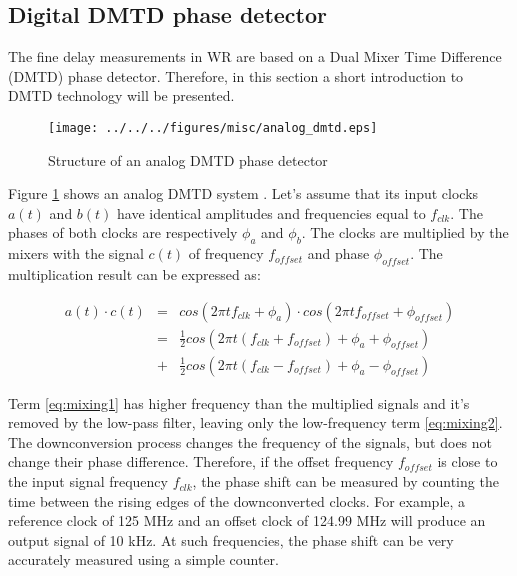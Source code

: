 \subsection{Digital DMTD phase detector}
\label{s:dmtd}
The fine delay measurements in WR are based on a Dual Mixer Time Difference
(DMTD) phase detector. Therefore, in this section a short introduction to
DMTD technology will be presented.
\begin{figure}[ht!]
  \centering
  \texttt{[image: ../../../figures/misc/analog\_dmtd.eps]}
  \caption{Structure of an analog DMTD phase detector}
  \label{fig:analog_dmtd}
\end{figure}
Figure \ref{fig:analog_dmtd} shows an analog DMTD system \cite{allan90}. Let's
assume that its input clocks $a(t)$ and $b(t)$ have identical amplitudes and
frequencies equal to $f_{clk}$. The phases of both clocks are respectively
$\phi_{a}$ and $\phi_{b}$. The clocks are multiplied by the mixers with
the signal $c(t)$ of frequency $f_{offset}$ and phase $\phi_{offset}$. The
multiplication result can be expressed as:

\begin{eqnarray}
    a(t) \cdot c(t) & = & cos(2\pi t f_{clk} + \phi_{a}) \cdot cos (2\pi t
    f_{offset} + \phi_{offset}) \nonumber \\
\label{eq:mixing1}& = & \frac{1}{2} cos(2\pi t (f_{clk} + f_{offset}) +
\phi_a + \phi_{offset}) \\
\label{eq:mixing2}& + & \frac{1}{2} cos (2 \pi t (f_{clk} - f_{offset}) +
\phi_a - \phi_{offset})
\end{eqnarray}

Term \ref{eq:mixing1} has higher frequency than the multiplied signals and
it's removed by the low-pass filter, leaving only the low-frequency term
\ref{eq:mixing2}. The downconversion process changes the frequency of the
signals, but does not change their phase difference. Therefore, if the offset
frequency $f_{offset}$ is close to the input signal frequency $f_{clk}$,
the phase shift can be measured by counting the time between the rising
edges of the downconverted clocks. For example, a reference clock of 125
MHz and an offset clock of 124.99 MHz will produce an output signal of 10
kHz. At such frequencies, the phase shift can be very accurately measured
using a simple counter.


